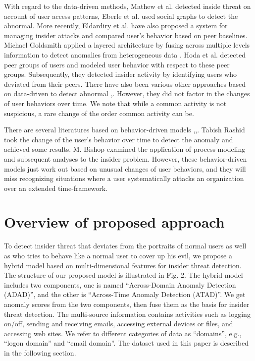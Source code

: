 \documentclass[conference]{IEEEtran}
\begin{document}
With regard to the data-driven methods, Mathew et al. \cite{b13} detected inside threat on account of user access patterns, Eberle et al. \cite{b14} used social graphs to detect the abnormal. More recently, Eldardiry et al. \cite{b15} have also proposed a system for managing insider attacks and compared user’s behavior based on peer baselines.
Michael Goldsmith applied a layered architecture by fusing across multiple levels information to detect anomalies from heterogeneous data \cite{b16}. Hoda et al. \cite{b13} detected peer groups of users and modeled user behavior with respect to these peer groups. Subsequently, they detected insider activity by identifying users who deviated from their peers. 
There have also been various other approaches based on data-driven to detect abnormal \cite{b10},\cite{b8}. 
However, they did not factor in the changes of user behaviors over time. We note that while a common activity is not suspicious, a rare change of the order common activity can be. 

There are several literatures based on behavior-driven models \cite{b7},\cite{b11},\cite{b12}. 
Tabish Rashid \cite{b17} took the change of the user's behavior over time to detect the anomaly and achieved some results. M. Bishop \cite{b11} examined the application of process modeling
and subsequent analyses to the insider problem. 
However, these behavior-driven models just work out based on unusual changes of user behaviors, and they will miss recognizing situations where a user systematically attacks an organization over an extended time-framework.



\section{Overview of proposed approach}
To detect insider threat that deviates from the portraits of normal users as well as who tries to behave like a normal user to cover up his evil,
we propose a hybrid model based on multi-dimensional features for insider threat detection. The structure of our proposed model is illustrated in Fig. 2. The hybrid model includes two components, one is named ``Across-Domain Anomaly Detection (ADAD)'', and the other is ``Across-Time Anomaly Detection (ATAD)''. We get anomaly scores from the two components, then fuse them as the basis for insider threat detection.  The multi-source information contains activities such as logging on/off, sending and receiving emails, accessing external devices or files, and
accessing web sites. We refer to different categories of data as “domains”, e.g., “logon domain” and “email domain”. The dataset used in this paper is described in the following section. 
\end{document}
